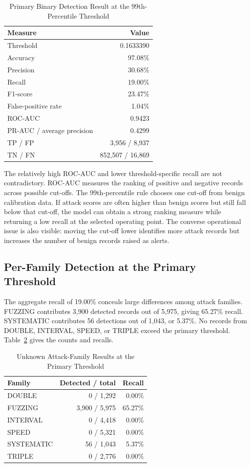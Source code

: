 \documentclass[journal]{IEEEtran}
\begin{document}
\begin{table}[!t]
\caption{Primary Binary Detection Result at the 99th-Percentile Threshold}
\label{tab:primary}
\centering\footnotesize
\begin{tabular}{lr}
\toprule
Measure & Value\\
\midrule
Threshold & 0.1633390\\
Accuracy & 97.08\%\\
Precision & 30.68\%\\
Recall & 19.00\%\\
F1-score & 23.47\%\\
False-positive rate & 1.04\%\\
ROC-AUC & 0.9423\\
PR-AUC / average precision & 0.4299\\
TP / FP & 3,956 / 8,937\\
TN / FN & 852,507 / 16,869\\
\bottomrule
\end{tabular}
\end{table}

The relatively high ROC-AUC and lower threshold-specific recall are not contradictory. ROC-AUC measures the ranking of positive and negative records across possible cut-offs. The 99th-percentile rule chooses one cut-off from benign calibration data. If attack scores are often higher than benign scores but still fall below that cut-off, the model can obtain a strong ranking measure while returning a low recall at the selected operating point. The converse operational issue is also visible: moving the cut-off lower identifies more attack records but increases the number of benign records raised as alerts.

\subsection{Per-Family Detection at the Primary Threshold}
The aggregate recall of 19.00\% conceals large differences among attack families. FUZZING contributes 3,900 detected records out of 5,975, giving 65.27\% recall. SYSTEMATIC contributes 56 detections out of 1,043, or 5.37\%. No records from DOUBLE, INTERVAL, SPEED, or TRIPLE exceed the primary threshold. Table~\ref{tab:familyprimary} gives the counts and recalls.

\begin{table}[!t]
\caption{Unknown Attack-Family Results at the Primary Threshold}
\label{tab:familyprimary}
\centering\footnotesize
\begin{tabular}{lrr}
\toprule
Family & Detected / total & Recall\\
\midrule
DOUBLE & 0 / 1,292 & 0.00\%\\
FUZZING & 3,900 / 5,975 & 65.27\%\\
INTERVAL & 0 / 4,418 & 0.00\%\\
SPEED & 0 / 5,321 & 0.00\%\\
SYSTEMATIC & 56 / 1,043 & 5.37\%\\
TRIPLE & 0 / 2,776 & 0.00\%\\
\bottomrule
\end{tabular}
\end{table}
\end{document}
